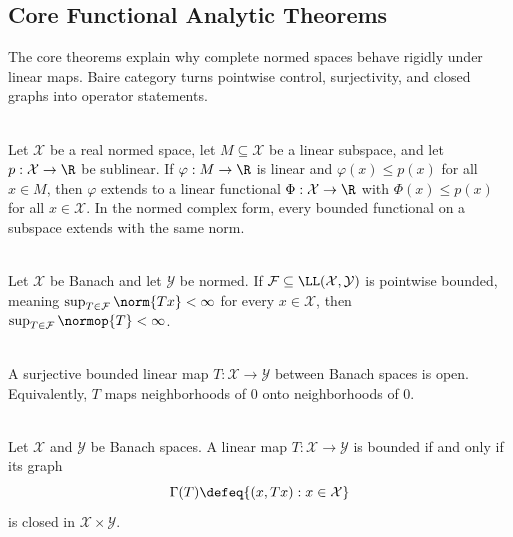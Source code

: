 \subsection{Core Functional Analytic Theorems}

%

The core theorems explain why complete normed spaces behave rigidly under linear maps. Baire category turns pointwise control, surjectivity, and closed graphs into operator statements.

\begin{theorem} \label{thm:hahn-banach-extension} \\
Let $\mathcal{X}$ be a real normed space, let $M\subseteq\mathcal{X}$ be a linear subspace, and let $p:\mathcal{X}\to\R$ be sublinear. If $\varphi:M\to\R$ is linear and $\varphi(x)\leq p(x)$ for all $x\in M$, then $\varphi$ extends to a linear functional $\Phi:\mathcal{X}\to\R$ with $\Phi(x)\leq p(x)$ for all $x\in\mathcal{X}$. In the normed complex form, every bounded functional on a subspace extends with the same norm.
\end{theorem}

\begin{theorem} \label{thm:uniform-boundedness-principle} \\
Let $\mathcal{X}$ be Banach and let $\mathcal{Y}$ be normed. If $\mathcal{F}\subseteq\LL(\mathcal{X},\mathcal{Y})$ is pointwise bounded, meaning $\sup_{T\in\mathcal{F}}\norm{Tx}<\infty$ for every $x\in\mathcal{X}$, then $\sup_{T\in\mathcal{F}}\normop{T}<\infty$.
\end{theorem}

\begin{theorem} \label{thm:open-mapping-theorem} \\
A surjective bounded linear map $T:\mathcal{X}\to\mathcal{Y}$ between Banach spaces is open. Equivalently, $T$ maps neighborhoods of $0$ onto neighborhoods of $0$.
\end{theorem}

\begin{theorem} \label{thm:closed-graph-theorem} \\
Let $\mathcal{X}$ and $\mathcal{Y}$ be Banach spaces. A linear map $T:\mathcal{X}\to\mathcal{Y}$ is bounded if and only if its graph
\[
\Gamma(T)\defeq\{(x,Tx):x\in\mathcal{X}\}
\]
is closed in $\mathcal{X}\times\mathcal{Y}$.
\end{theorem}
